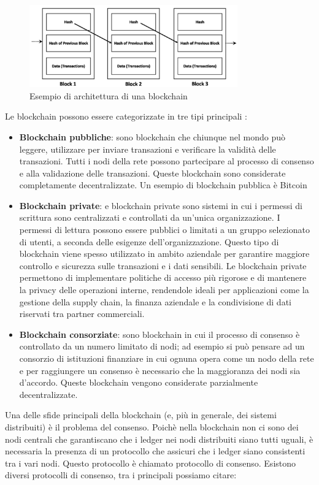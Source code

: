 \documentclass[../../Thesis.tex]{subfiles}
\begin{document}
\begin{figure}[h!]
    \centering
    \includegraphics[width=0.8\textwidth]{../../img/Blockchain.png}
    \caption{Esempio di architettura di una blockchain}
    \label{fig:Blockchain}
\end{figure}
Le blockchain possono essere categorizzate in tre tipi principali \cite{Tassonomia}:
\begin{itemize}
    \item \textbf{Blockchain pubbliche}: sono blockchain che chiunque nel mondo può leggere, utilizzare per inviare transazioni e verificare la validità delle transazioni. Tutti i nodi della rete possono partecipare al processo di consenso e alla validazione delle transazioni. Queste blockchain sono considerate completamente decentralizzate. Un esempio di blockchain pubblica è Bitcoin
    \item \textbf{Blockchain private}: e blockchain private sono sistemi in cui i permessi di scrittura sono centralizzati e controllati da un'unica organizzazione. I permessi di lettura possono essere pubblici o limitati a un gruppo selezionato di utenti, a seconda delle esigenze dell'organizzazione. Questo tipo di blockchain viene spesso utilizzato in ambito aziendale per garantire maggiore controllo e sicurezza sulle transazioni e i dati sensibili. Le blockchain private permettono di implementare politiche di accesso più rigorose e di mantenere la privacy delle operazioni interne, rendendole ideali per applicazioni come la gestione della supply chain, la finanza aziendale e la condivisione di dati riservati tra partner commerciali.
    \item \textbf{Blockchain consorziate}: sono blockchain in cui il processo di consenso è controllato da un numero limitato di nodi; ad esempio si può pensare ad un consorzio di istituzioni finanziare in cui ognuna opera come un nodo della rete e per raggiungere un consenso è necessario che la maggioranza dei nodi sia d'accordo. Queste blockchain vengono considerate parzialmente decentralizzate.
\end{itemize}
Una delle sfide principali della blockchain (e, più in generale, dei sistemi distribuiti) è il problema del consenso. Poichè nella blockchain non ci sono dei nodi centrali che garantiscano che i ledger nei nodi distribuiti siano tutti uguali, è necessaria la presenza di un protocollo che assicuri che i ledger siano consistenti tra i vari nodi. Questo protocollo è chiamato protocollo di consenso. Esistono diversi protocolli di consenso, tra i principali possiamo citare:
\end{document}
